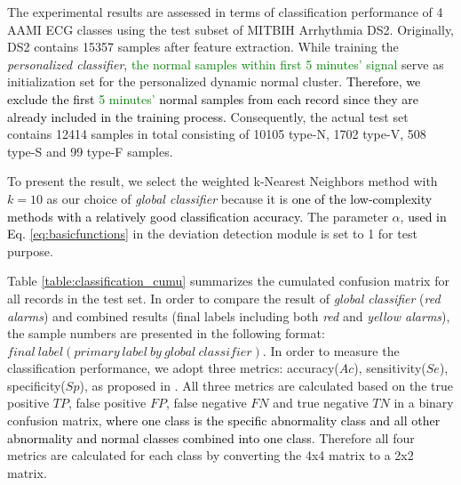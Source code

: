 The experimental results are assessed in terms of classification performance of 4 AAMI ECG classes using the test subset of MITBIH Arrhythmia DS2. Originally, DS2 contains 15357 samples after feature extraction. While training the \textit{personalized classifier}, \textcolor{green}{the normal samples within first 5 minutes' signal} serve as initialization set for the personalized dynamic normal cluster. \textcolor{black}{Therefore, we exclude the first \textcolor{green}{5 minutes'} normal samples from each record since they are already included in the training process.} Consequently, the actual test set contains 12414 samples in total consisting of 10105 type-N, 1702 type-V, 508 type-S and 99 type-F samples.

To present the result, we select the weighted k-Nearest Neighbors method with $k=10$ as our choice of \textit{global classifier} because it is \textcolor{black}{one of the low-complexity methods with a relatively good classification accuracy\cite{hechenbichler2004weighted}. }%
The parameter $\alpha$, \textcolor{black}{used in Eq. \ref{eq:basicfunctions}} in the deviation detection module is set to 1 for test purpose. 


Table \ref{table:classification_cumu} summarizes the cumulated confusion matrix for all records in the test set. In order to compare the result of \textit{global classifier} (\textit{red alarms}) and combined results (final labels including both \textit{red} and \textit{yellow alarms}), the sample numbers are presented in the following format: $final~label(primary~label~by~global~ classifier)$. In order to measure the classification performance, we adopt three metrics: accuracy($Ac$), sensitivity($Se$), specificity($Sp$), as proposed in \cite{Hu_et_al,deChazal2006,ince2009generic}. All three metrics are calculated based on the true positive $TP$, false positive $FP$, false negative $FN$ and true negative $TN$ in a binary confusion matrix, \textcolor{black}{where one class is the specific abnormality class and all other abnormality and normal classes combined into one class}. Therefore all four metrics are calculated for each class by converting the 4x4 matrix to a 2x2 matrix.


